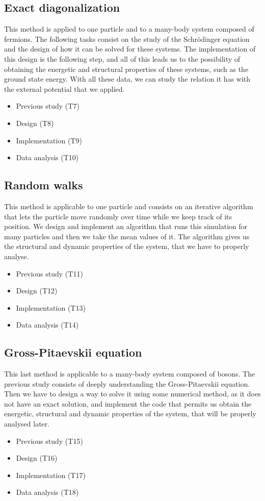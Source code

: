 \documentclass{article}
\begin{document}
\subsection{Exact diagonalization}
This method is applied to one particle and to a many-body system composed of fermions. The following tasks consist on the study of the Schrödinger equation and the design of how it can be solved for these systems. The implementation of this design is the following step, and all of this leads us to the possibility of obtaining the energetic and structural properties of these systems, such as the ground state energy. With all these data, we can study the relation it has with the external potential that we applied.

\begin{itemize}
    \item Previous study (T7)
    \item Design (T8)
    \item Implementation (T9)
    \item Data analysis (T10)
\end{itemize}

\subsection{Random walks}
This method is applicable to one particle and consists on an iterative algorithm that lets the particle move randomly over time while we keep track of its position. We design and implement an algorithm that runs this simulation for many particles and then we take the mean values of it. The algorithm gives us the structural and dynamic properties of the system, that we have to properly analyse. 
\begin{itemize}
    \item Previous study (T11)
    \item Design (T12)
    \item Implementation (T13)
    \item Data analysis (T14)
\end{itemize}
\subsection{Gross-Pitaevskii equation}
This last method is applicable to a many-body system composed of
bosons. The previous study consists of deeply understanding the Gross-Pitaevskii equation. Then we have to design a way to solve it using some numerical method, as it does not have an exact solution, and implement the code that permits us obtain the energetic, structural and dynamic properties of the system, that will be properly analysed later.
\begin{itemize}
    \item Previous study (T15)
    \item Design (T16)
    \item Implementation (T17)
    \item Data analysis (T18)
\end{itemize}
\end{document}
